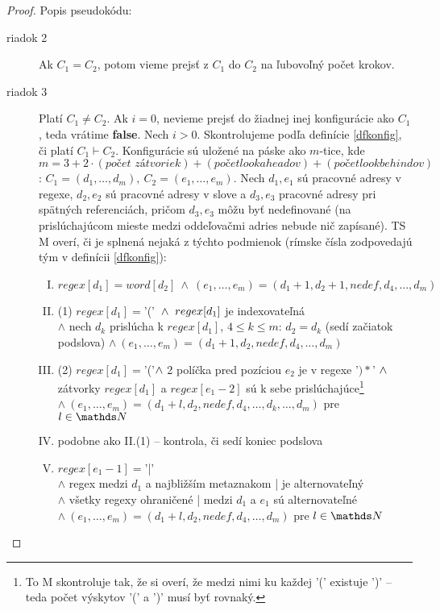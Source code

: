 \begin{proof}
Popis pseudokódu:
\begin{description}
\item[riadok 2] Ak $C_1=C_2$, potom vieme prejsť z $C_1$ do $C_2$ na ľubovoľný počet krokov.
\item[riadok 3] Platí $C_1 \neq C_2$. Ak $i=0$, nevieme prejsť do žiadnej inej konfigurácie ako $C_1$, teda vrátime \textbf{false}. Nech $i>0$. Skontrolujeme podľa definície \ref{dfkonfig}, či platí $C_1 \vdash C_2$. Konfigurácie sú uložené na páske ako $m$-tice, kde $m = 3+2\cdot (\textit{počet zátvoriek})+(počet lookaheadov)+(počet lookbehindov)$: $C_1 = (d_1,\dots, d_m), ~C_2=(e_1,\dots,e_m)$. Nech $d_1, e_1$ sú pracovné adresy v regexe, $d_2,e_2$ sú pracovné adresy v slove a $d_3,e_3$ pracovné adresy pri spätných referenciách, pričom $d_3,e_3$ môžu byť nedefinované (na prislúchajúcom mieste medzi oddeľovačmi adries nebude nič zapísané). TS M overí, či je splnená nejaká z týchto podmienok (rímske čísla zodpovedajú tým v definícii \ref{dfkonfig}):
\begin{enumerate}[I.]
\item $regex[d_1]=word[d_2]~\wedge~(e_1,\dots,e_m) = (d_1+1,d_2+1,nedef,d_4, \dots, d_m)$
\item (1) $regex[d_1]=$'('$ \\ ~\wedge~regex[d_1]$ je indexovateľná \\ $\wedge$ nech $d_k$ prislúcha k $regex[d_1]$, $4\leq k \leq m$: $d_2=d_k$ (sedí začiatok podslova) $ \wedge ~(e_1,\dots, e_m) = (d_1+1,d_2,nedef,d_4,\dots,d_m)$
\setcounter{enumi}{1}
\item (2) $regex[d_1]=$'('$ \\ \wedge$ 2 políčka pred pozíciou $e_2$ je v regexe '$)*$' $ \\ \wedge$ zátvorky $regex[d_1]$ a $regex[e_1-2]$ sú k sebe prislúchajúce\footnote{To M skontroluje tak, že si overí, že medzi nimi ku každej '(' existuje ')' -- teda počet výskytov '(' a ')' musí byť rovnaký.} \\ $\wedge ~(e_1,\dots,e_m)=(d_1+l, d_2,nedef,d_4,\dots,d_k,\dots,d_m)$ pre $l\in\N$
\item podobne ako II.(1) -- kontrola, či sedí koniec podslova
\item $regex[e_1-1] =$'|' \\ $\wedge$ regex medzi $d_1$ a najbližším metaznakom | je alternovateľný \\ $\wedge$ všetky regexy ohraničené | medzi $d_1$ a $e_1$ sú alternovateľné \\ $\wedge~ (e_1,\dots, e_m)=(d_1+l,d_2,nedef,d_4,\dots,d_m)$ pre $l\in\N$

\end{enumerate}
\end{description}
\end{proof}
